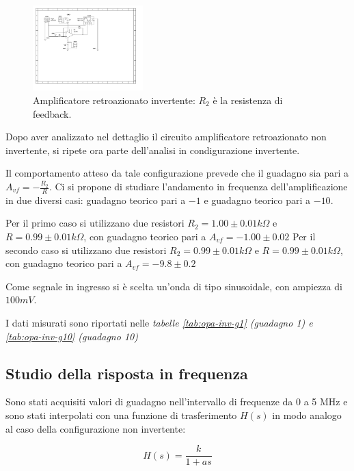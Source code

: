 \documentclass[journal]{IEEEtran}
\begin{document}
\begin{figure}[H]%
\begin {center}
\includegraphics[width=0.38\textwidth]{sch-simulations/output/OPA-closed-loop-inverting.pdf}
\caption{Amplificatore retroazionato invertente: $R_2$ è la resistenza di feedback.}
\label{fig:circ_closed_loop_inv}
\end {center}
\end{figure}

Dopo aver analizzato nel dettaglio il circuito amplificatore retroazionato non invertente, si ripete ora parte dell'analisi in condigurazione invertente.

Il comportamento atteso da tale configurazione prevede che il guadagno sia pari a $A_{vf} = -\frac{R_2}{R}$. 
Ci si propone di studiare l'andamento in frequenza dell'amplificazione in due diversi casi: guadagno teorico pari a $-1$ e guadagno teorico pari a $-10$.

Per il primo caso si utilizzano due resistori $R_2 = 1.00 \pm 0.01 k\Omega $ e $R = 0.99 \pm 0.01 k\Omega$, con guadagno teorico pari a $A_{vf} = -1.00 \pm 0.02 $ Per il secondo caso si utilizzano due resistori $R_2 = 0.99 \pm 0.01 k\Omega $ e $R = 0.99 \pm 0.01 k\Omega$, con guadagno teorico pari a $A_{vf} = -9.8 \pm 0.2$

Come segnale in ingresso si è scelta un'onda di tipo sinusoidale, con ampiezza di $100 mV$.

I dati misurati sono riportati nelle \textit{tabelle \ref{tab:opa-inv-g1} (guadagno 1) e \ref{tab:opa-inv-g10} (guadagno 10)}

\subsection{\textbf{Studio della risposta in frequenza}}

Sono stati acquisiti valori di guadagno nell'intervallo di frequenze da 0 a 5 MHz e sono stati interpolati con una funzione di trasferimento $H(s)$ in modo analogo al caso della configurazione non invertente: 

\begin{equation}
    H(s) = \frac{k}{1+as}
\end{equation}
\end{document}
